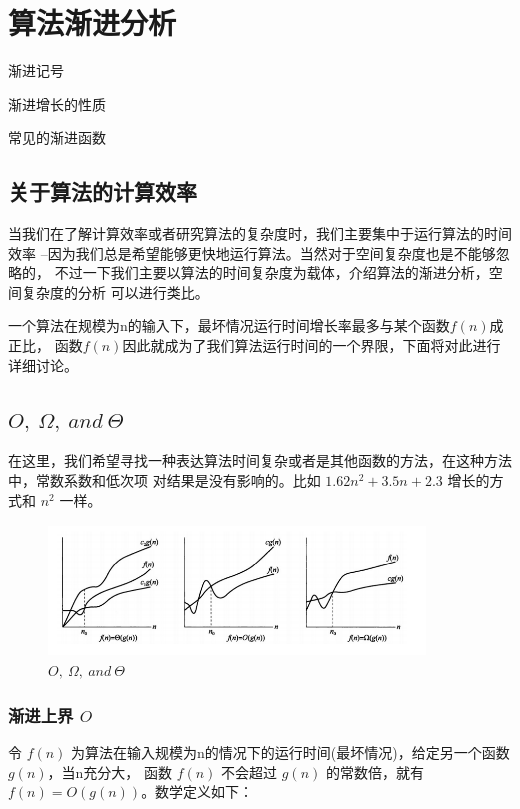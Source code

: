 \chapter{算法渐进分析}

\begin{introduction}
   \item 渐进记号
   \item 渐进增长的性质
   \item 常见的渐进函数
\end{introduction}

\section{关于算法的计算效率}
当我们在了解计算效率或者研究算法的复杂度时，我们主要集中于运行算法的时间效率
--因为我们总是希望能够更快地运行算法。当然对于空间复杂度也是不能够忽略的，
不过一下我们主要以算法的时间复杂度为载体，介绍算法的渐进分析，空间复杂度的分析
可以进行类比。
 
一个算法在规模为n的输入下，最坏情况运行时间增长率最多与某个函数$f(n)$成正比，
函数$f(n)$因此就成为了我们算法运行时间的一个界限，下面将对此进行详细讨论。
 
\section{\texorpdfstring{$O,\ \Omega,\ and\ \Theta $}{O, Ω, and θ}}
在这里，我们希望寻找一种表达算法时间复杂或者是其他函数的方法，在这种方法中，常数系数和低次项
对结果是没有影响的。比如 $1.62n^2+3.5n+2.3$ 增长的方式和 $n^2$ 一样。

\begin{figure}[h]
   \begin{minipage}[t]{1\linewidth}
      \centering
      \includegraphics[width=10cm,height=3.5cm]{image/asymptotic_analysis_1.png}
      \caption{$O,\ \Omega,\ and\ \Theta $}
   \end{minipage}
\end{figure}
 
\subsection{渐进上界 $O$}
令 $f(n)$ 为算法在输入规模为n的情况下的运行时间(最坏情况)，给定另一个函数 $g(n)$，当n充分大，
函数 $f(n)$ 不会超过 $g(n)$ 的常数倍，就有 $f(n)=O(g(n))$。数学定义如下：

